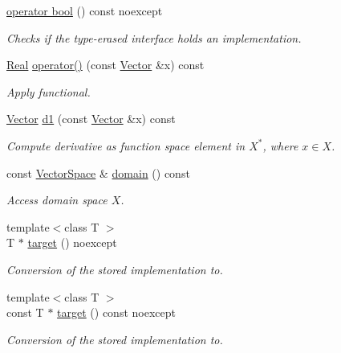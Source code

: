 \begin{DoxyCompactItemize}
\item 
\hyperlink{classSpacy_1_1C1Functional_a0b5ae1057d50803d71c7e221424e1ed4}{operator bool} () const noexcept
\begin{DoxyCompactList}\small\item\em \-Checks if the type-\/erased interface holds an implementation. \end{DoxyCompactList}\item 
\hypertarget{classSpacy_1_1C1Functional_a621b710f0c8c583d074f4bf4da3cbb09}{\hyperlink{classSpacy_1_1Real}{\-Real} \hyperlink{classSpacy_1_1C1Functional_a621b710f0c8c583d074f4bf4da3cbb09}{operator()} (const \hyperlink{classSpacy_1_1Vector}{\-Vector} \&x) const }\label{classSpacy_1_1C1Functional_a621b710f0c8c583d074f4bf4da3cbb09}

\begin{DoxyCompactList}\small\item\em \-Apply functional. \end{DoxyCompactList}\item 
\hypertarget{classSpacy_1_1C1Functional_a5953291c58bf20e87ab2bfe26231fe49}{\hyperlink{classSpacy_1_1Vector}{\-Vector} \hyperlink{classSpacy_1_1C1Functional_a5953291c58bf20e87ab2bfe26231fe49}{d1} (const \hyperlink{classSpacy_1_1Vector}{\-Vector} \&x) const }\label{classSpacy_1_1C1Functional_a5953291c58bf20e87ab2bfe26231fe49}

\begin{DoxyCompactList}\small\item\em \-Compute derivative as function space element in $X^*$, where $x\in X$. \end{DoxyCompactList}\item 
\hypertarget{classSpacy_1_1C1Functional_a3ec8df7e7998b557445c907cbd8e80b8}{const \hyperlink{classSpacy_1_1VectorSpace}{\-Vector\-Space} \& \hyperlink{classSpacy_1_1C1Functional_a3ec8df7e7998b557445c907cbd8e80b8}{domain} () const }\label{classSpacy_1_1C1Functional_a3ec8df7e7998b557445c907cbd8e80b8}

\begin{DoxyCompactList}\small\item\em \-Access domain space $X$. \end{DoxyCompactList}\item 
{\footnotesize template$<$class T $>$ }\\\-T $\ast$ \hyperlink{classSpacy_1_1C1Functional_adf7c0fc5a81009ebf4f8c5d9bdb9ec98}{target} () noexcept
\begin{DoxyCompactList}\small\item\em \-Conversion of the stored implementation to. \end{DoxyCompactList}\item 
{\footnotesize template$<$class T $>$ }\\const \-T $\ast$ \hyperlink{classSpacy_1_1C1Functional_aa016d1671e43b875064cf3d9d9bb6351}{target} () const noexcept
\begin{DoxyCompactList}\small\item\em \-Conversion of the stored implementation to. \end{DoxyCompactList}\end{DoxyCompactItemize}


